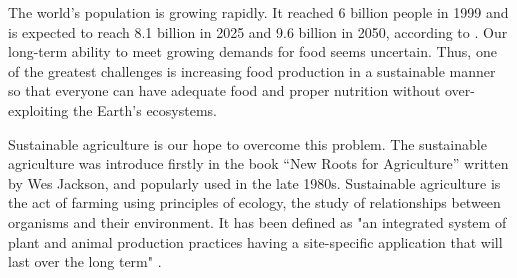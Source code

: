 




The world's population is growing rapidly. It reached 6 billion people in 1999 and is expected to reach 8.1 billion in 2025 and 9.6 billion in 2050, according to \citet{un2013world}. Our long-term ability to meet growing demands for food seems uncertain. Thus, one of the greatest challenges is increasing food production in a sustainable manner so that everyone can have adequate food and proper nutrition without over-exploiting the Earth’s ecosystems.

Sustainable agriculture is our hope to overcome this problem. The sustainable agriculture was introduce firstly in the book ``New Roots for Agriculture'' written by Wes Jackson, and popularly used in the late 1980s. Sustainable agriculture is the act of farming using principles of ecology, the study of relationships between organisms and their environment. It has been defined as "an integrated system of plant and animal production practices having a site-specific application that will last over the long term" \citep{wiki:susagri}.

